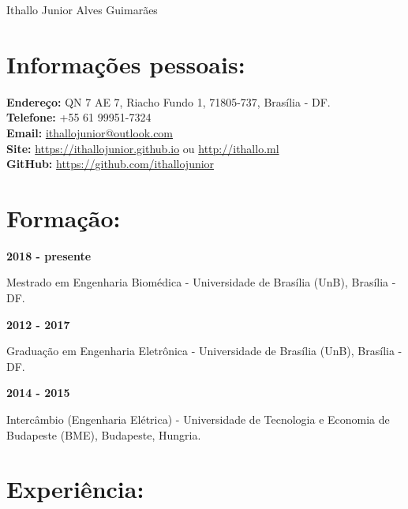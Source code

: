 \documentclass[11pt]{article}
\begin{document}
\begin{center}
\huge{Ithallo Junior Alves Guimarães}
\end{center}

\section{Informações pessoais:}

\begin{addmargin}{0.5cm}

\textbf{Endereço:}  QN 7 AE 7, Riacho Fundo 1, 71805-737, Brasília - DF. \\
\textbf{Telefone:}  +55 61 99951-7324 \\
\textbf{Email:}   \href{maito:ithallojunior@outlook.com}{ithallojunior@outlook.com} \\
\textbf{Site:}  \url{https://ithallojunior.github.io} ou \url{http://ithallo.ml} \\
\textbf{GitHub:} \url{https://github.com/ithallojunior}

\end{addmargin}


\section{Formação:}

\textbf{2018 - presente}
\begin{addmargin}{0.5cm}
Mestrado em Engenharia Biomédica - Universidade de Brasília (UnB), Brasília - DF. \\
\end{addmargin}

\textbf{2012 - 2017}
\begin{addmargin}{0.5cm}
Graduação em Engenharia Eletrônica - Universidade de Brasília (UnB), Brasília - DF. \\
\end{addmargin}

\textbf{2014 - 2015} 
\begin{addmargin}{0.5cm}
Intercâmbio (Engenharia Elétrica) - Universidade de Tecnologia e Economia de Budapeste (BME), Budapeste, Hungria. 
\end{addmargin}

\section{Experiência:}
\end{document}
